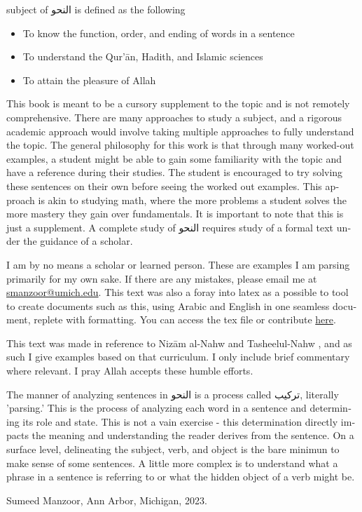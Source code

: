 \documentclass[../main.tex]{subfiles}
\begin{document}
\begin{english}
     subject of \textarabic{النحو} is defined as the following
    \begin{itemize}
        \item To know the function, order, and ending of words in a sentence
        \item To understand the Qur'ān, Hadith, and Islamic sciences
        \item To attain the pleasure of Allah \jalla
    \end{itemize}
    This book is meant to be a cursory supplement to the topic and is not remotely comprehensive. There are many approaches to study a subject, and a rigorous academic approach would involve taking multiple approaches to fully understand the topic. The general philosophy for this work is that through many worked-out examples, a student might be able to gain some familiarity with the topic and have a reference during their studies. The student is encouraged to try solving these sentences on their own before seeing the worked out examples. This approach is akin to studying math, where the more problems a student solves the more mastery they gain over fundamentals. It is important to note that this is just a supplement. A complete study of \textarabic{النحو} requires study of a formal text under the guidance of a scholar.

    I am by no means a scholar or learned person. These are examples I am parsing primarily for my own sake. If there are any mistakes, please email me at \href{mailto:smanzoor@umich.edu}{smanzoor@umich.edu}. This text was also a foray into latex as a possible to tool to create documents such as this, using Arabic and English in one seamless document, replete with formatting. You can access the tex file or contribute \href{https://github.com/Yoyomanzoor/alnahw-bilmiran}{here}.

    This text was made in reference to Nizām al-Nahw \autocite{nizam} and Tasheelul-Nahw \autocite{tasheel}, and as such I give examples based on that curriculum. I only include brief commentary where relevant. I pray Allah accepts these humble efforts.
    
    The manner of analyzing sentences in \textarabic{النحو} is a process called \textarabic{تركيب}, literally 'parsing.' This is the process of analyzing each word in a sentence and determining its role and state. This is not a vain exercise - this determination directly impacts the meaning and understanding the reader derives from the sentence. On a surface level, delineating the subject, verb, and object is the bare minimun to make sense of some sentences. A little more complex is to understand what a phrase in a sentence is referring to or what the hidden object of a verb might be.
    
    Sumeed Manzoor, Ann Arbor, Michigan, 2023.
\end{english}

\pagebreak
\end{document}
